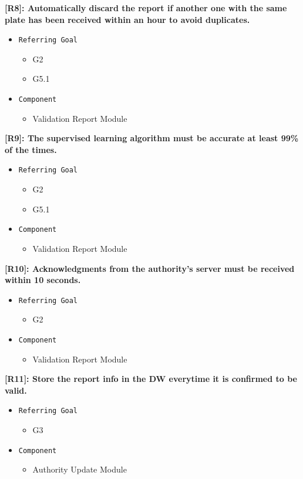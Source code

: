 \documentclass[12pt,a4paper]{article}
\begin{document}
\textbf{[R8]: Automatically discard the report if another one with the same plate has been received within an hour to avoid duplicates.}
\begin{itemize}
	\item \texttt{Referring Goal}
	\begin{itemize}
		\item G2
		\item G5.1
	\end{itemize}
	\item \texttt{Component}
	\begin{itemize}
			\item Validation Report Module
	\end{itemize}
\end{itemize}
\textbf{[R9]: The supervised learning algorithm must be accurate at least 99\% of the times.}
\begin{itemize}
	\item \texttt{Referring Goal}
	\begin{itemize}
		\item G2
		\item G5.1
	\end{itemize}
	\item \texttt{Component}
	\begin{itemize}
		\item Validation Report Module		\end{itemize}
\end{itemize}
\textbf{[R10]: Acknowledgments from the authority's server must be received within 10 seconds.}
\begin{itemize}
	\item \texttt{Referring Goal}
	\begin{itemize}
		\item G2
	\end{itemize}
	\item \texttt{Component}
	\begin{itemize}
		\item Validation Report Module
	\end{itemize}
\end{itemize}
\textbf{[R11]: Store the report info in the DW everytime it is confirmed to be valid.}
\begin{itemize}
	\item \texttt{Referring Goal}
	\begin{itemize}
		\item G3
	\end{itemize}
	\item \texttt{Component}
	\begin{itemize}
		\item Authority Update Module
	\end{itemize}
\end{itemize}
\end{document}
